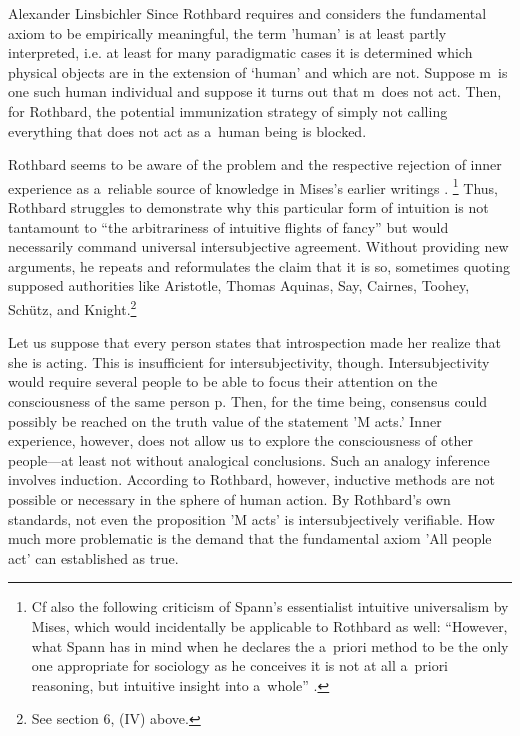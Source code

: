 \begin{artengenv}{Alexander Linsbichler}
Since Rothbard requires and considers the fundamental axiom to be empirically meaningful, the term 'human' is at least partly interpreted, i.e. at least for many paradigmatic cases it is determined which physical objects are in the extension of ‘human' and which are not. Suppose m~is one such human individual and suppose it turns out that m~does not act. Then, for Rothbard, the potential immunization strategy of simply not calling everything that does not act as a~human being is blocked.



Rothbard seems to be aware of the problem and the respective rejection of inner experience as a~reliable source of knowledge in Mises's earlier writings 
\parencite[e.g.][pp.17–19]{mises_nationalokonomie_1940}.%
\footnote{Cf also the following criticism of Spann's essentialist intuitive universalism by Mises, which would incidentally be applicable to Rothbard as well: ``However, what Spann has in mind when he declares the a~priori method to be the only one appropriate for sociology as he conceives it is not at all a~priori reasoning, but intuitive insight into a~whole'' 
\parencite[][p.46]{mises_epistemological_2003}.%
} Thus, Rothbard struggles to demonstrate why this particular form of intuition is not tantamount to ``the arbitrariness of intuitive flights of fancy'' 
\parencite[][p.52]{mises_epistemological_2003} %
 but would necessarily command universal intersubjective agreement. Without providing new arguments, he repeats and reformulates the claim that it is so, sometimes quoting supposed authorities like Aristotle, Thomas Aquinas, Say, Cairnes, Toohey, Schütz, and Knight.\footnote{See section 6, (IV) above.}



Let us suppose that every person states that introspection made her realize that she is acting. This is insufficient for intersubjectivity, though. Intersubjectivity would require several people to be able to focus their attention on the consciousness of the same person p. Then, for the time being, consensus could possibly be reached on the truth value of the statement 'M acts.' Inner experience, however, does not allow us to explore the consciousness of other people---at least not without analogical conclusions. Such an analogy inference involves induction. According to Rothbard, however, inductive methods are not possible or necessary in the sphere of human action. By Rothbard's own standards, not even the proposition 'M acts' is intersubjectively verifiable. How much more problematic is the demand that the fundamental axiom 'All people act' can established as true.




\end{artengenv}
